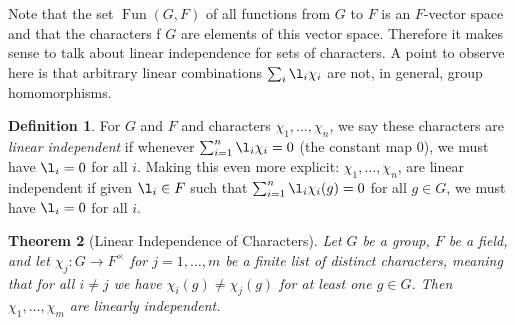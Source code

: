 \documentclass[12pt]{report}
\newtheorem{theorem}{Theorem}[chapter]
\numberwithin{equation}{section}
\numberwithin{theorem}{chapter}
\theoremstyle{definition}
\newtheorem{definition}[theorem]{Definition}
\newtheorem*{basic properties}{Basic Properties}
\newtheorem*{Important Remark}{Important Remark}
\DeclareMathOperator{\Fun}{Fun}
\begin{document}
Note that the set $\Fun(G,F)$ of all functions from $G$ to $F$ is an $F$-vector space and that the characters f $G$ are elements of this vector space. Therefore it makes sense to talk about linear independence for sets of characters. A point to observe here is that arbitrary linear combinations  $\sum_i \l_i \chi_i$ are not, in general, group homomorphisms.

\begin{definition}
For $G$ and $F$ and characters $\chi_1, \dots, \chi_n$, we say these
characters are {\em linear independent} if whenever
$\sum_{i=1}^n \l_i \chi_i=0$  (the constant map $0$), we must have $\l_i
= 0$ for all $i$. Making this even more explicit:
$\chi_1, \dots, \chi_n$,
are linear independent if given $\l_i \in F$ such that $\sum_{i=1}^n \l_i
\chi_i(g) = 0$ for all $g \in G$, we must have $\l_i = 0$ for all $i$.
\end{definition}




\begin{theorem}[Linear Independence of Characters]\label{linear independence of characters}
Let $G$ be a group, $F$ be a field, and let $\chi_j: G \to F^{\times}$ for $j = 1, \dots, m$ be a finite list of distinct characters, meaning that for all $i \neq j$ we have $\chi_i(g) \neq \chi_j(g)$ for at least one $g \in G$. Then $\chi_1, \dots, \chi_m$ are linearly independent.
\end{theorem}
\end{document}
